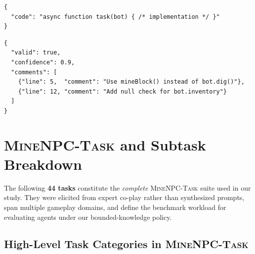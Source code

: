 \begin{lstlisting}[style=json,caption={Code generation output example.}]
{
  "code": "async function task(bot) { /* implementation */ }"
}
\end{lstlisting}

\begin{lstlisting}[style=json,caption={Code review output example.}]
{
  "valid": true,
  "confidence": 0.9,
  "comments": [
    {"line": 5,  "comment": "Use mineBlock() instead of bot.dig()"},
    {"line": 12, "comment": "Add null check for bot.inventory"}
  ]
}
\end{lstlisting}


\clearpage

\providecommand{\appxsep}{\vspace{0.8\baselineskip}}
\providecommand{\appxsmallsep}{\vspace{0.45\baselineskip}}



\BackToTwoColumn

\section{\textsc{MineNPC-Task} and Subtask Breakdown}
\label{app:tasksuite}


\appxsmallsep
The following \textbf{44 tasks} constitute the \emph{complete} \textsc{MineNPC-Task} suite used in our study. They were elicited from expert co-play rather than synthesized prompts, span multiple gameplay domains, and define the benchmark workload for evaluating agents under our bounded-knowledge policy.

\appxsep
\subsection{High-Level Task Categories in \textsc{MineNPC-Task}}


